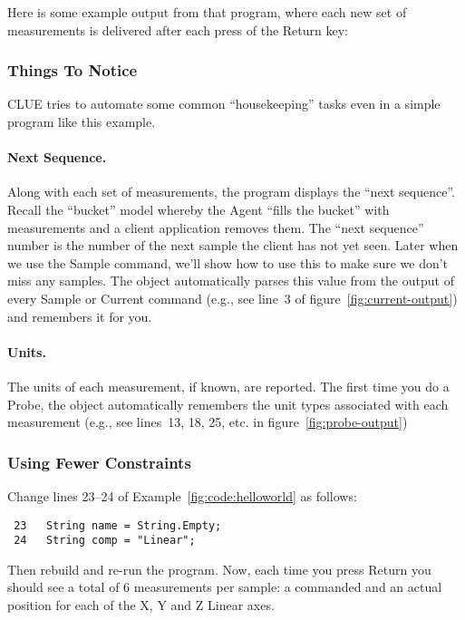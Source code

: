 Here is some example output from that program, where each new set of
measurements is delivered after each press of the Return key:

\subsubsection{Things To Notice}

CLUE tries to automate some common ``housekeeping'' tasks even in a
simple program like this example.

\paragraph{Next Sequence.} Along with each set of measurements, the
program displays the ``next sequence''.  Recall the ``bucket'' model
whereby the Agent ``fills the bucket'' with measurements and a client
application removes them.  The ``next sequence'' number is the number of
the next sample the client has not yet seen.  Later when we use the
Sample command, we'll show how to use this to make sure we don't miss
any samples.  The  object automatically parses this
value from the output of every Sample or Current command (e.g., see
line~3 of figure~\ref{fig:current-output}) and remembers it for you.

\paragraph{Units.} The units of each measurement, if known, are
reported.  The first time you do a Probe, the  object
automatically remembers the unit types associated with each measurement
(e.g., see lines~13, 18, 25, etc. in figure~\ref{fig:probe-output})



\subsubsection{Using Fewer Constraints}

Change lines 23--24 of Example~\ref{fig:code:helloworld}  as follows:

\begin{verbatim}
 23   String name = String.Empty;
 24   String comp = "Linear";

\end{verbatim}

Then rebuild and re-run the program.  Now, each time you press Return
you should see a total of 6 measurements per sample: a commanded and an
actual position for each of the X, Y and Z Linear axes.

